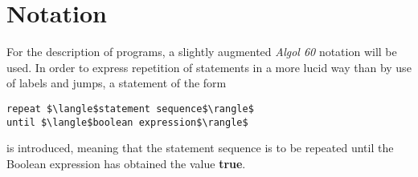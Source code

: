 \section{Notation}

For the description of programs, a slightly augmented \emph{Algol 60} notation
will be used.  In order to express repetition of statements in a more lucid way
than by use of labels and jumps, a statement of the form

\begin{lstlisting}
repeat $\langle$statement sequence$\rangle$
until $\langle$boolean expression$\rangle$
\end{lstlisting}

is introduced, meaning that the statement sequence is to be repeated until
the Boolean expression has obtained the value \textbf{true}.
